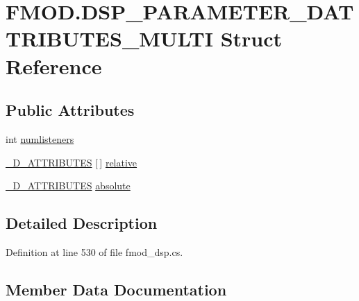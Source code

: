 \hypertarget{struct_f_m_o_d_1_1_d_s_p___p_a_r_a_m_e_t_e_r__3_d_a_t_t_r_i_b_u_t_e_s___m_u_l_t_i}{}\section{F\+M\+O\+D.\+D\+S\+P\+\_\+\+P\+A\+R\+A\+M\+E\+T\+E\+R\+\_\+D\+A\+T\+T\+R\+I\+B\+U\+T\+E\+S\+\_\+\+M\+U\+L\+TI Struct Reference}
\label{struct_f_m_o_d_1_1_d_s_p___p_a_r_a_m_e_t_e_r__3_d_a_t_t_r_i_b_u_t_e_s___m_u_l_t_i}
\subsection*{Public Attributes}
\begin{DoxyCompactItemize}
\item 
int \hyperlink{struct_f_m_o_d_1_1_d_s_p___p_a_r_a_m_e_t_e_r__3_d_a_t_t_r_i_b_u_t_e_s___m_u_l_t_i_a8735d737619d1ebde73643ae2eb30032}{numlisteners}
\item 
\hyperlink{struct_f_m_o_d_1_1__3_d___a_t_t_r_i_b_u_t_e_s}{\+\_\+D\+\_\+\+A\+T\+T\+R\+I\+B\+U\+T\+ES} \mbox{[}$\,$\mbox{]} \hyperlink{struct_f_m_o_d_1_1_d_s_p___p_a_r_a_m_e_t_e_r__3_d_a_t_t_r_i_b_u_t_e_s___m_u_l_t_i_a1a61cdabacf759a76466e86584d107c1}{relative}
\item 
\hyperlink{struct_f_m_o_d_1_1__3_d___a_t_t_r_i_b_u_t_e_s}{\+\_\+D\+\_\+\+A\+T\+T\+R\+I\+B\+U\+T\+ES} \hyperlink{struct_f_m_o_d_1_1_d_s_p___p_a_r_a_m_e_t_e_r__3_d_a_t_t_r_i_b_u_t_e_s___m_u_l_t_i_aec02dc6817b5f793ca08b15a0dca8df6}{absolute}
\end{DoxyCompactItemize}


\subsection{Detailed Description}


Definition at line 530 of file fmod\+\_\+dsp.\+cs.



\subsection{Member Data Documentation}
\mbox{\label{struct_f_m_o_d_1_1_d_s_p___p_a_r_a_m_e_t_e_r__3_d_a_t_t_r_i_b_u_t_e_s___m_u_l_t_i_aec02dc6817b5f793ca08b15a0dca8df6}} 
